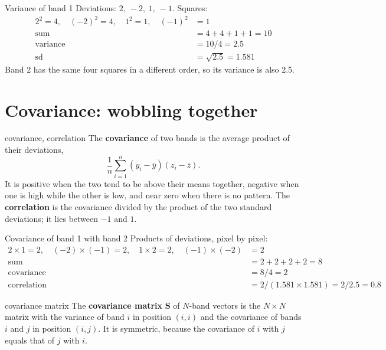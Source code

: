 \documentclass[11pt,a4paper,oneside,openany]{book}
\newcommand{\B}[1]{{\symbf{#1}}}
\newcommand{\B}[1]{{\bm{#1}}}
\newcommand{\mS}{\B{S}}
\begin{document}
\begin{worked}[label=we:var]{Variance of band 1}
Deviations: $2,\ -2,\ 1,\ -1$. Squares:
\begin{align*}
2^2=4,\quad (-2)^2=4,\quad 1^2=1,\quad (-1)^2&=1\\
\text{sum} &= 4+4+1+1=10\\
\text{variance} &= 10/4=2.5\\
\text{sd} &= \sqrt{2.5}=1.581
\end{align*}
Band 2 has the same four squares in a different order, so its variance is also 2.5.
\end{worked}

\section{Covariance: wobbling together}

\begin{defn}{covariance, correlation}
The \textbf{covariance} of two bands is the average product of their deviations,
\[
  \frac1n\sum_{i=1}^n (y_i-\bar y)(z_i-\bar z).
\]
It is positive when the two tend to be above their means together, negative when one is high while the other is low, and
near zero when there is no pattern. The \textbf{correlation} is the covariance divided by the product of the two standard
deviations; it lies between $-1$ and $1$.
\end{defn}

\begin{worked}[label=we:cov]{Covariance of band 1 with band 2}
Products of deviations, pixel by pixel:
\begin{align*}
2\times1=2,\quad (-2)\times(-1)=2,\quad 1\times2=2,\quad (-1)\times(-2)&=2\\
\text{sum} &= 2+2+2+2=8\\
\text{covariance} &= 8/4=2\\
\text{correlation} &= 2/(1.581\times1.581)=2/2.5=0.8
\end{align*}
\end{worked}

\begin{defn}{covariance matrix}
The \textbf{covariance matrix} $\mS$ of $N$-band vectors is the $N\times N$ matrix with the variance of band $i$ in position
$(i,i)$ and the covariance of bands $i$ and $j$ in position $(i,j)$. It is symmetric, because the covariance of $i$ with $j$
equals that of $j$ with $i$.
\end{defn}
\end{document}
